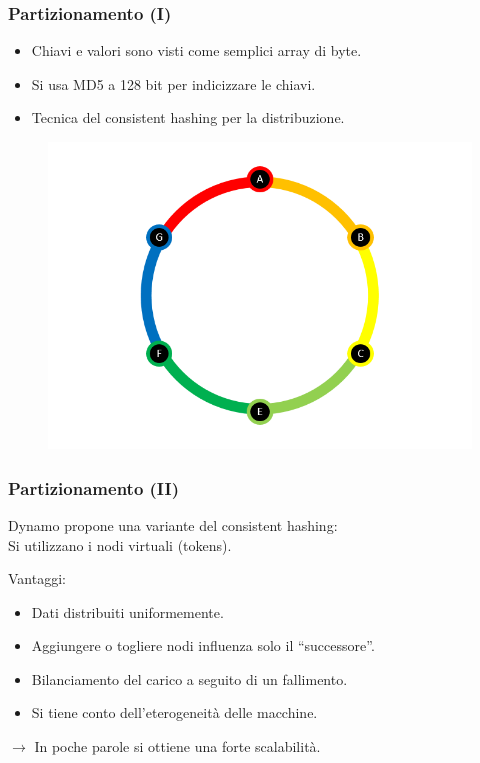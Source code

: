 \begin{frame}
  \frametitle{Partizionamento (I)}
  \begin{itemize}
  \item Chiavi e valori sono visti come semplici array di byte.
  \item Si usa MD5 a 128 bit per indicizzare le chiavi.
  \item Tecnica del \alert{consistent hashing} per la distribuzione.
  \end{itemize}
  \begin{figure}
  \centering
  \includegraphics[scale=0.60]{dynamo/consistent-hashing-ring.png}
  \end{figure}
\end{frame}


\begin{frame}
  \frametitle{Partizionamento (II)}
  Dynamo propone una variante del consistent hashing: \\
  Si utilizzano i \alert{nodi virtuali} (tokens).
  \begin{block}{Vantaggi:}
  \begin{itemize}
  \item Dati distribuiti uniformemente.
  \item Aggiungere o togliere nodi influenza solo il ``successore''.
  \item Bilanciamento del carico a seguito di un fallimento.
  \item Si tiene conto dell'eterogeneità delle macchine.
  \end{itemize}
  \end{block}
  $\longrightarrow$ In poche parole si ottiene una forte \alert{scalabilità}.
\end{frame}


